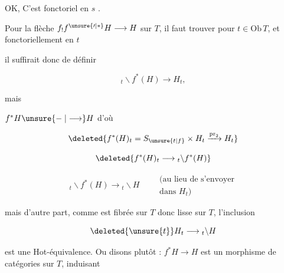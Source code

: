 OK, C'est fonctoriel en $s$ \unsure{\ldots}.

Pour la flèche $f_! f^{\unsure{\prime|*}}H\longrightarrow H$ sur $T$, il faut trouver pour  $t\in\mathrm{Ob}\,T$, et fonctoriellement en $t$


il suffirait donc de définir

\[
{}_{t}\backslash f^*(H)\longrightarrow H_t,
\]

mais 


 $f^*H\unsure{\mathrel{-}|\longrightarrow}H$ d'où

\[
\deleted{f^*(H)_t=S_{\unsure{t|f}}\times H_t\xrightarrow{\mathrm{pr}_2}H_t}
\]


\[
\deleted{f^*(H)_t\longrightarrow {}_{t}\backslash f^*(H)}
\]

\[
{}_{t}\backslash f^*(H)\longrightarrow {}_{t}\backslash H
\qquad\substack{\text{(au lieu de s'envoyer}\\\text{dans }H_t\text{)}}
\]

mais d'autre part, comme  est fibrée sur $T$ donc lisse sur $T$, l'inclusion

\[
\deleted{\unsure{t}}H_t\longrightarrow {}_{t}\backslash H
\]

est une Hot-équivalence. Ou disons plutôt : $f^*H\longrightarrow H$ est un morphisme de catégories sur $T$, induisant


